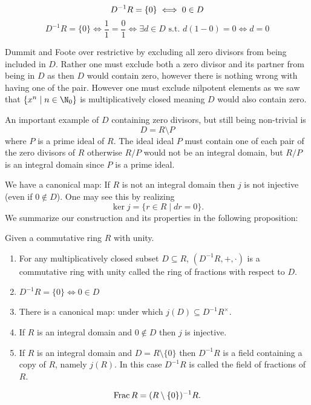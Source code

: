 \documentclass[master.tex]{subfiles}
\begin{document}
  \begin{rmk*}
    \[D^{-1}R = \{0\} \iff 0 \in D\\\]
    \[D^{-1}R = \{0\} \iff \frac{1}{1}=\frac{0}{1} \iff \exists d \in D \text{ s.t. } d(1-0)=0 \iff d=0\]
  \end{rmk*}
  Dummit and Foote over restrictive by excluding all zero divisors from being included in \(D\). Rather one must exclude
  both a zero divisor and its partner from being in \(D\) as then \(D\) would contain zero, however there is nothing
  wrong with having one of the pair. However one must exclude nilpotent elements as we saw that
  \(\{x^n \mid n \in \N_0\}\) is multiplicatively closed meaning \(D\) would also contain zero.
  \begin{example*}
    An important example of \(D\) containing zero divisors, but still being non-trivial is
    \[D=R \setminus P\] where \(P\) is a prime ideal of \(R\). The ideal ideal \(P\) must contain one of each pair of
    the zero divisors of \(R\) otherwise \(R/P\) would not be an integral domain, but \(R/P\) is an integral domain
    since \(P\) is a prime ideal.
  \end{example*}
  We have a canonical map:  If \(R\) is not an integral domain then \(j\)
  is not injective (even if \(0 \not \in D\)). One may see this by realizing
  \[\ker j = \{r \in R \mid dr = 0\}.\]
  We summarize our construction and its properties in the following proposition:
  \begin{prop}Given a commutative ring \(R\) with unity.
    \begin{enumerate}[label=(\alph*)]
    \item For any multiplicatively closed subset \(D \subseteq R\), \(\left(D^{-1}R,+,\cdot\right)\) is a commutative ring with unity
      called the ring of fractions with respect to \(D\).
    \item \(D^{-1}R=\{0\}\iff 0 \in D\)
    \item There is a canonical map:  under which
      \(j(D) \subseteq D^{-1}R^\times\).
    \item If \(R\) is an integral domain and \(0 \not \in D\) then \(j\) is injective.
    \item If \(R\) is an integral domain and \(D=R \setminus \{0\}\) then \(D^{-1}R\) is a field containing a copy of
      \(R\), namely \(j(R)\). In this case \(D^{-1}R\) is called the field of fractions of \(R\).
    \end{enumerate}
    \begin{notation}
      \[\operatorname{Frac}{R}=(R\setminus\{0\})^{-1}R.\]
    \end{notation}
  \end{prop}
\end{document}
